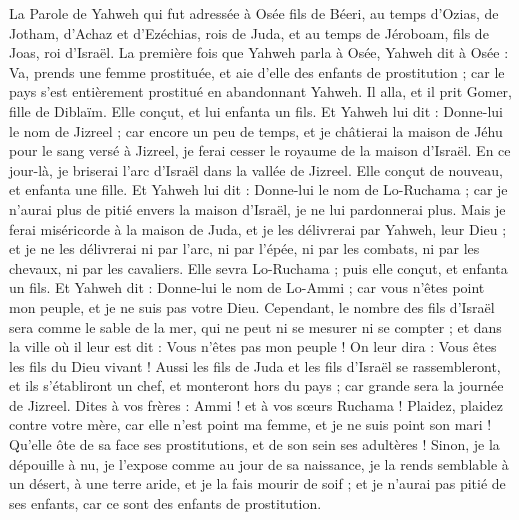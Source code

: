 \begin{multicols}{2}
\TextTitle{[Introduction]}
\VerseOne{}La Parole de Yahweh qui fut adressée à Osée fils de Béeri, au temps d’Ozias, de Jotham, d’Achaz et d’Ezéchias, rois de Juda, et au temps de Jéroboam, fils de Joas, roi d'Israël.
La première fois que Yahweh parla à Osée, Yahweh dit à Osée : Va, prends une femme prostituée, et aie d'elle des enfants de prostitution ; car le pays s’est entièrement prostitué en abandonnant Yahweh.
Il alla, et il prit Gomer, fille de Diblaïm. Elle conçut, et lui enfanta un fils.
Et Yahweh lui dit : Donne-lui le nom de Jizreel ; car encore un peu de temps, et je châtierai la maison de Jéhu pour le sang versé à Jizreel, je ferai cesser le royaume de la maison d'Israël.
En ce jour-là, je briserai l'arc d'Israël dans la vallée de Jizreel.
Elle conçut de nouveau, et enfanta une fille. Et Yahweh lui dit : Donne-lui le nom de Lo-Ruchama ; car je n’aurai plus de pitié envers la maison d'Israël, je ne lui pardonnerai plus.
Mais je ferai miséricorde à la maison de Juda, et je les délivrerai par Yahweh, leur Dieu ; et je ne les délivrerai ni par l'arc, ni par l'épée, ni par les combats, ni par les chevaux, ni par les cavaliers.
Elle sevra Lo-Ruchama ; puis elle conçut, et enfanta un fils.
Et Yahweh dit : Donne-lui le nom de Lo-Ammi ; car vous n'êtes point mon peuple, et je ne suis pas votre Dieu.
\VerseOne{}Cependant, le nombre des fils d'Israël sera comme le sable de la mer, qui ne peut ni se mesurer ni se compter ; et dans la ville où il leur est dit : Vous n’êtes pas mon peuple ! On leur dira : Vous êtes les fils du Dieu vivant !
Aussi les fils de Juda et les fils d'Israël se rassembleront, et ils s'établiront un chef, et monteront hors du pays ; car grande sera la journée de Jizreel.
Dites à vos frères : Ammi ! et à vos sœurs Ruchama !
Plaidez, plaidez contre votre mère, car elle n’est point ma femme, et je ne suis point son mari ! Qu’elle ôte de sa face ses prostitutions, et de son sein ses adultères !
Sinon, je la dépouille à nu, je l’expose comme au jour de sa naissance, je la rends semblable à un désert, à une terre aride, et je la fais mourir de soif ;
et je n’aurai pas pitié de ses enfants, car ce sont des enfants de prostitution.

\end{multicols}
